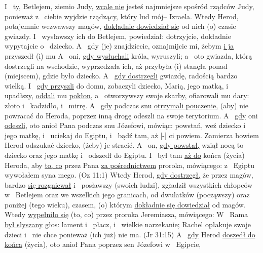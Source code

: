  I~ ty, Betlejem, ziemio Judy, \underline{wcale nie} jesteś najmniejsze spośród rządców Judy, ponieważ z~ ciebie wyjdzie rządzący, który  lud mój– Izraela.
 Wtedy Herod, potajemnie wezwawszy magów, \underline{dokładnie dowiedział się} od nich (o) czasie  gwiazdy.
 I~ wysławszy ich do Betlejem, powiedział: dotrzyjcie, dokładnie wypytajcie o~ dziecko. A~ gdy (je) znajdziecie, oznajmijcie mi, żebym \underline{i ja} przyszedł (i)  mu 
 A~ oni, \underline{gdy wysłuchali} króla, wyruszyli; a~ oto gwiazda, którą dostrzegli na wschodzie, wyprzedzała ich, aż przybyła (i) stanęła ponad (miejscem), gdzie było dziecko.
 A~ \underline{gdy dostrzegli} gwiazdę,  radością bardzo wielką.
 I~ \underline{gdy przyszli} do domu, zobaczyli dziecko,  Marią, jego matką, i~ upadłszy, \underline{oddali} mu \underline{pokłon,} a~ otworzywszy swoje skarby, ofiarowali mu dary: złoto i~ kadzidło, i~ mirrę.
 A~ \underline{gdy} podczas snu \underline{otrzymali pouczenie,} (aby) nie powracać do Heroda, poprzez inną drogę odeszli na swoje terytorium.
 A~ \underline{gdy} oni \underline{odeszli,} oto anioł Pana  podczas snu Józefowi, mówiąc: powstań, weź dziecko i~ jego matkę, i~ uciekaj do Egiptu, i~ bądź tam, aż [-] ci powiem. Zamierza bowiem Herod odszukać dziecko, (żeby) je stracić.
 A~ on, \underline{gdy powstał,} wziął nocą to dziecko oraz jego matkę i~ odszedł do Egiptu.
 I~ był tam \underline{aż do} końca (życia) Heroda, aby  \underline{to, co}  przez Pana \underline{za pośrednictwem} proroka, mówiącego: z~ Egiptu wywołałem syna mego. (Oz 11:1)
 Wtedy Herod, \underline{gdy dostrzegł,} że  przez magów, bardzo \underline{się rozgniewał} i~ posławszy (swoich ludzi), zgładził wszystkich chłopców w~ Betlejem oraz we wszelkich jego granicach, od dwulatków (począwszy) oraz poniżej (tego wieku),  czasem, (o) którym \underline{dokładnie się dowiedział} od magów.
 Wtedy \underline{wypełniło się} (to, co)  przez proroka Jeremiasza, mówiącego:
 W~ Rama \underline{był słyszany} głos: lament i~ płacz, i~ wielkie narzekanie; Rachel opłakuje swoje dzieci i~ nie chce  ponieważ (ich już) nie ma. (Jr 31:15)
 A~ \underline{gdy} Herod \underline{doszedł do końca} (życia), oto anioł Pana poprzez sen  Józefowi w~ Egipcie,
